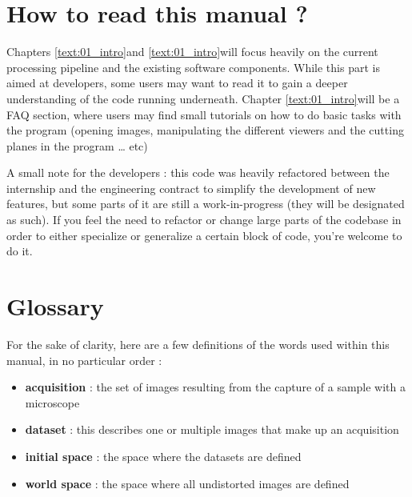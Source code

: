 \section{How to read this manual ?}\label{text:01_intro:02_howtoread}
{

	Chapters \ref{text:01_intro}\footnotemark and \ref{text:01_intro}\footnotemark[\value{footnote}] will focus heavily on the current processing pipeline and the existing software components. While this part is aimed at developers, some users may want to read it to gain a deeper understanding of the code running underneath.
	Chapter \ref{text:01_intro} will be a FAQ section, where users may find small tutorials on how to do basic tasks with the program (opening images, manipulating the different viewers and the cutting planes in the program \ldots{} etc)

	\vspace{\baselineskip}

	A small note for the developers : this code was heavily refactored between the internship and the engineering contract to simplify the development of new features, but some parts of it are still a work-in-progress (they will be designated as such). If you feel the need to refactor or change large parts of the codebase in order to either specialize or generalize a certain block of code, you're welcome to do it.
}

\section{Glossary}\label{text:01_intro:03_definitions}
{
	For the sake of clarity, here are a few definitions of the words used within this manual, in no particular order :

	\begin{itemize}
		\item \textbf{acquisition} : the set of images resulting from the capture of a sample with a microscope
		\item \textbf{dataset} : this describes one or multiple images that make up an acquisition
		\item \textbf{initial space} : the space where the datasets are defined
		\item \textbf{world space} : the space where all undistorted images are defined
	\end{itemize}
}


